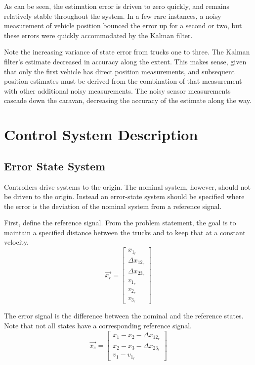 \documentclass[12pt,onecolumn,reqno]{amsart}
\begin{document}
As can be seen, the estimation error is driven to zero quickly, and remains
relatively stable throughout the system. In a few rare instances, a noisy
measurement of vehicle position bounced the error up for a second or two, but
these errors were quickly accommodated by the Kalman filter.

Note the increasing variance of state error from trucks one to three. The Kalman
filter's estimate decreased in accuracy along the extent. This makes sense,
given that only the first vehicle has direct position measurements, and
subsequent position estimates must be derived from the combination of that
measurement with other additional noisy measurements. The noisy sensor
measurements cascade down the caravan, decreasing the accuracy of the estimate
along the way.


\section{Control System Description}
\subsection{Error State System}
Controllers drive systems to the origin. The nominal system, however, should not
be driven to the origin. Instead an error-state system should be specified where
the error is the deviation of the nominal system from a reference signal.

First, define the reference signal. From the problem statement, the goal is to
maintain a specified distance between the trucks and to keep that at a constant
velocity.
\begin{equation}
  \vec{x_{r}} = 
  \begin{bmatrix}
    x_{1_{r}}         \\
    \Delta x_{12_{r}} \\
    \Delta x_{23_{r}} \\
    v_{1_{r}}         \\
    v_{2_{r}}         \\
    v_{3_{r}}
  \end{bmatrix}
\end{equation}

The error signal is the difference between the nominal and the reference states.
Note that not all states have a corresponding reference signal.
\begin{equation}
  \vec{x_{e}} = 
  \begin{bmatrix}
    x_{1} - x_{2} - \Delta x_{12_{r}} \\
    x_{2} - x_{3} - \Delta x_{23_{r}} \\
    v_{1} - v_{1_{r}}
  \end{bmatrix}
\end{equation}
\end{document}
